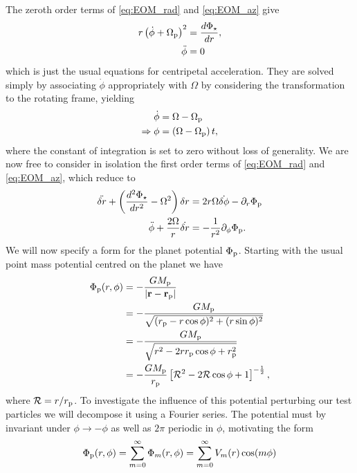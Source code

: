 The zeroth order terms of \ref{eq:EOM_rad} and \ref{eq:EOM_az} give 
\begin{align}
    r \left( \dot{\phi} + \Omega_{\rm p}  \right)^2 &= \frac{d\Phi_\star}{dr} , \\
    \ddot{\phi} &= 0
\end{align}
which is just the usual equations for centripetal acceleration. 
They are solved simply by associating $\dot{\phi}$ appropriately with $\Omega$ by considering the transformation to the rotating frame, yielding
\begin{align}
    \dot {\phi} &= \Omega - \Omega_{\rm p} \\
    \Rightarrow \phi &= \left( \Omega - \Omega_{\rm p} \right) t,
\end{align}
where the constant of integration is set to zero without loss of generality.
We are now free to consider in isolation the first order terms of \ref{eq:EOM_rad} and \ref{eq:EOM_az}, which reduce to 
\begin{align}
    \ddot{\delta r} + \left( \frac{d^2\Phi_\star}{dr^2} - \Omega^2 \right) \delta r &= 2 r \Omega \dot{\delta \phi} - \partial_r \Phi_{\rm p} \label{eq:lin_rad_lindblad} \\
    \ddot{\phi} + \frac{2 \Omega}{r} \dot{\delta r} &= - \frac{1}{r^2} \partial_\phi \Phi_{\rm p}. \label{eq:lin_az_lindblad}
\end{align}
We will now specify a form for the planet potential $\Phi_{\rm p}$.
Starting with the usual point mass potential centred on the planet we have
\begin{align}
    \Phi_{\rm p} (r,\phi) &= -\frac{G M_{\rm p}}{|\bf{r} - \bf{r_{\rm p}}|} \\
    &= -\frac{G M_{\rm p}}{\sqrt{(r_{\rm p} - r \cos \phi)^2 + (r \sin \phi)^2}} \\
    &= -\frac{G M_{\rm p}}{\sqrt{r^2 - 2 r r_{\rm p} \cos \phi + r_{\rm p}^2}} \\
    &= -\frac{G M_{\rm p}}{r_{\rm p}} \left[ \mathcal{R}^2 - 2 \mathcal{R} \cos \phi + 1\right]^{-\frac{1}{2}},
\end{align}
where $\mathcal{R} = r / r_{\rm p}$.
To investigate the influence of this potential perturbing our test particles we will decompose it using a Fourier series.
The potential must by invariant under $\phi \rightarrow -\phi$ as well as $2 \pi$ periodic in $\phi$, motivating the form
\begin{align}
    \Phi_{\rm p}(r,\phi) = \sum_{m=0}^\infty \Phi_m (r,\phi) = \sum_{m=0}^\infty V_m (r) \cos (m \phi) \label{eq:fourier_planet}
\end{align}
